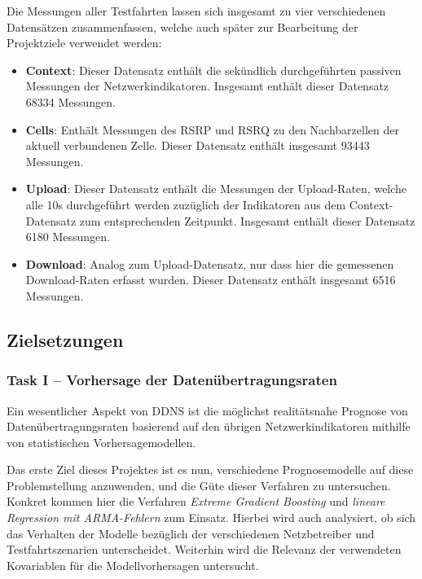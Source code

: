 Die Messungen aller Testfahrten lassen sich insgesamt zu vier verschiedenen Datens\"atzen zusammenfassen, welche auch sp\"ater
zur Bearbeitung der Projektziele verwendet werden:
\begin{itemize}
    \item \textbf{Context}: Dieser Datensatz enth\"alt die sek\"undlich durchgef\"uhrten passiven Messungen der Netzwerkindikatoren.
        Insgesamt enth\"alt dieser Datensatz 68334 Messungen.
    \item \textbf{Cells}: Enth\"alt Messungen des RSRP und RSRQ zu den Nachbarzellen der aktuell verbundenen Zelle.
        Dieser Datensatz enth\"alt insgesamt 93443 Messungen.
    \item \textbf{Upload}: Dieser Datensatz enth\"alt die Messungen der Upload-Raten, welche alle 10s durchgef\"uhrt werden zuz\"uglich
        der Indikatoren aus dem Context-Datensatz zum entsprechenden Zeitpunkt. Insgesamt enth\"alt dieser Datensatz 6180 Messungen.
    \item \textbf{Download}: Analog zum Upload-Datensatz, nur dass hier die gemessenen Down\-load-Ra\-ten erfasst wurden.
        Dieser Datensatz enth\"alt insgesamt 6516 Messungen.
\end{itemize}

\subsection{Zielsetzungen}

\subsubsection{Task I -- Vorhersage der Daten\"ubertragungsraten}

Ein wesentlicher Aspekt von DDNS ist die m\"oglichst realit\"atsnahe Prognose von Daten\"ubertragungsraten basierend auf
den \"ubrigen Netzwerkindikatoren mithilfe von statistischen Vorhersagemodellen.

Das erste Ziel dieses Projektes ist es nun, verschiedene Prognosemodelle
auf diese Problemstellung an\-zu\-wen\-den, und die G\"ute dieser Verfahren zu untersuchen.
Konkret kommen hier die Verfahren \textit{Extreme Gradient Boosting} und \textit{lineare Regression mit ARMA-Fehlern} zum
Einsatz.
Hierbei wird auch analysiert, ob sich das Verhalten der Modelle bez\"uglich der verschiedenen Netzbetreiber und Testfahrtszenarien
unterscheidet.
Weiterhin wird die Relevanz der verwendeten Kovariablen f\"ur die Modellvorhersagen untersucht.

